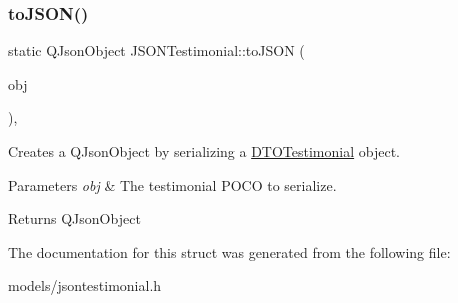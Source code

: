 \subsubsection{\texorpdfstring{toJSON()}{toJSON()}}
{\footnotesize\ttfamily static Q\+Json\+Object J\+S\+O\+N\+Testimonial\+::to\+J\+S\+ON (\begin{DoxyParamCaption}\item[{const \mbox{\hyperlink{struct_d_t_o_testimonial}{D\+T\+O\+Testimonial}}}]{obj }\end{DoxyParamCaption})\hspace{0.3cm}{\ttfamily [inline]}, {\ttfamily [static]}}



Creates a Q\+Json\+Object by serializing a \mbox{\hyperlink{struct_d_t_o_testimonial}{D\+T\+O\+Testimonial}} object. 


\begin{DoxyParams}{Parameters}
{\em obj} & The testimonial P\+O\+CO to serialize. \\
\hline
\end{DoxyParams}
\begin{DoxyReturn}{Returns}
Q\+Json\+Object 
\end{DoxyReturn}


The documentation for this struct was generated from the following file\+:\begin{DoxyCompactItemize}
\item 
models/jsontestimonial.\+h\end{DoxyCompactItemize}
